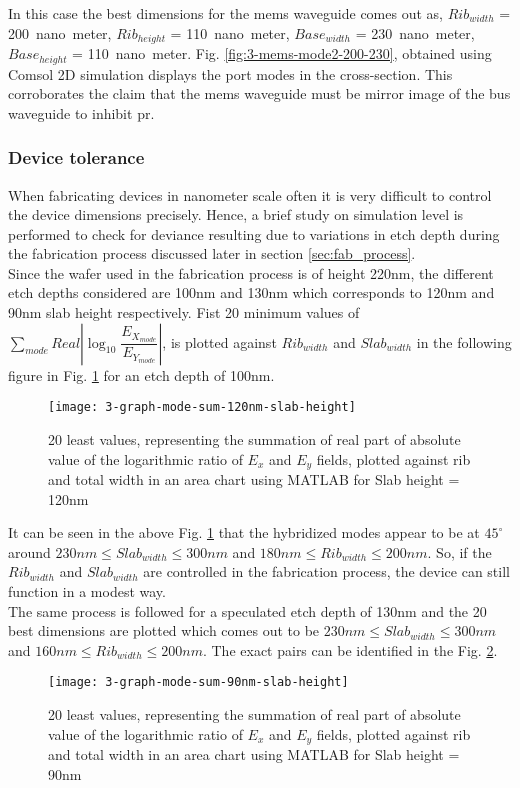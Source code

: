 \documentclass[../report.tex]{subfiles}
\begin{document}
In this case the best dimensions for the \gls{mems} waveguide comes out as, $Rib_{width}$ = \SI{200}{nano meter}, $Rib_{height}$ = \SI{110}{nano meter}, $Base_{width}$ = \SI{230}{nano meter}, $Base_{height}$ = \SI{110}{nano meter}. Fig. \ref{fig:3-mems-mode2-200-230}, obtained using Comsol 2D simulation displays the port modes in the cross-section. This corroborates the claim that the \gls{mems} waveguide must be mirror image of the bus waveguide to inhibit \gls{pr}.

\subsubsection{Device tolerance}
When fabricating devices in nanometer scale often it is very difficult to control the device dimensions precisely. Hence, a brief study on simulation level is performed to check for deviance resulting due to variations in etch depth during the fabrication process discussed later in section \ref{sec:fab_process}.\\  

Since the wafer used in the fabrication process is of height 220nm, the different etch depths considered are 100nm and 130nm which corresponds to 120nm and 90nm slab height respectively. Fist 20 minimum values of $\sum _{mode}Real\left| \log _{10}\dfrac {E_{X_{mode}}} {E_{Y_{mode}}}\right|$, is plotted against $Rib_{width}$ and $Slab_{width}$ in the following figure in Fig. \ref{fig:3_graph_mode_sum_120nm_slab_height} for an etch depth of 100nm. 

\begin{figure}[H] %
	\centering
	\texttt{[image: 3-graph-mode-sum-120nm-slab-height]}
	\caption{20 least values, representing the summation of real part of absolute value of the logarithmic ratio of $E_x$ and $E_y$ fields, plotted against rib and total width in an area chart using MATLAB for Slab height = 120nm}
	\label{fig:3_graph_mode_sum_120nm_slab_height}
\end{figure}
\noindent It can be seen in the above Fig. \ref{fig:3_graph_mode_sum_120nm_slab_height} that the hybridized modes appear to be at $45^{\circ}$ around $230nm \leq Slab_{width} \leq 300nm$ and $180nm \leq Rib_{width} \leq 200nm$. So, if the $Rib_{width}$ and $Slab_{width}$ are controlled in the fabrication process, the device can still function in a modest way.\\

The same process is followed for a speculated etch depth of 130nm and the 20 best dimensions are plotted which comes out to be $230nm \leq Slab_{width} \leq 300nm$ and $160nm \leq Rib_{width} \leq 200nm$. The exact pairs can be identified in the Fig. \ref{fig:3_graph_mode_sum_90nm_slab_height}.
\begin{figure}[H] %
	\centering
	\texttt{[image: 3-graph-mode-sum-90nm-slab-height]}
	\caption{20 least values, representing the summation of real part of absolute value of the logarithmic ratio of $E_x$ and $E_y$ fields, plotted against rib and total width in an area chart using MATLAB for Slab height = 90nm}
	\label{fig:3_graph_mode_sum_90nm_slab_height}
\end{figure}
\end{document}
